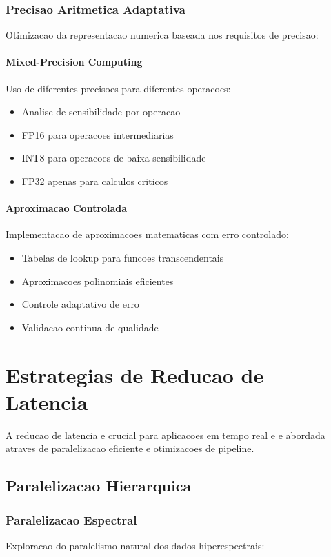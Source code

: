 \subsubsection{Precisao Aritmetica Adaptativa}
Otimizacao da representacao numerica baseada nos requisitos de precisao:

\paragraph{Mixed-Precision Computing}
Uso de diferentes precisoes para diferentes operacoes:
\begin{itemize}
    \item Analise de sensibilidade por operacao
    \item FP16 para operacoes intermediarias
    \item INT8 para operacoes de baixa sensibilidade
    \item FP32 apenas para calculos criticos
\end{itemize}

\paragraph{Aproximacao Controlada}
Implementacao de aproximacoes matematicas com erro controlado:
\begin{itemize}
    \item Tabelas de lookup para funcoes transcendentais
    \item Aproximacoes polinomiais eficientes
    \item Controle adaptativo de erro
    \item Validacao continua de qualidade
\end{itemize}

\section{Estrategias de Reducao de Latencia}\label{sec:reducao_latencia_estrategias}

A reducao de latencia e crucial para aplicacoes em tempo real e e abordada atraves de paralelizacao eficiente e otimizacoes de pipeline.

\subsection{Paralelizacao Hierarquica}

\subsubsection{Paralelizacao Espectral}
Exploracao do paralelismo natural dos dados hiperespectrais:

